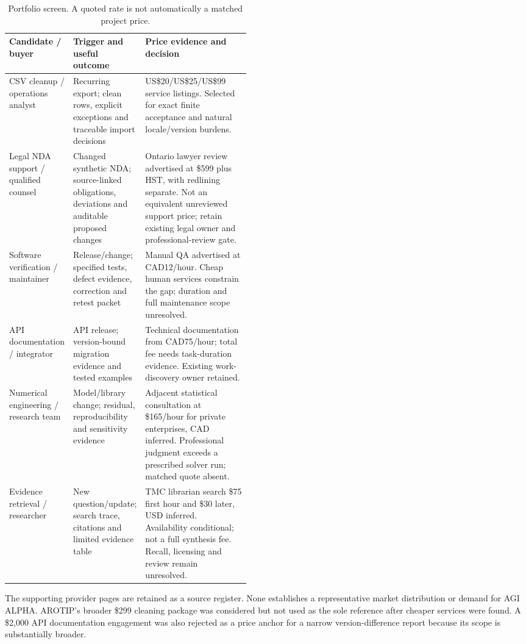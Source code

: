 \documentclass[11pt,letterpaper]{article}
\newcommand{\usd}[1]{US\$#1}
\begin{document}
\begin{table}[htbp]\small
\caption{Portfolio screen. A quoted rate is not automatically a matched project price.}
\begin{tabularx}{\linewidth}{@{}P{0.18\linewidth}P{0.28\linewidth}Y@{}}
\toprule
Candidate / buyer & Trigger and useful outcome & Price evidence and decision \\
\midrule
CSV cleanup / operations analyst & Recurring export; clean rows, explicit exceptions and traceable import decisions & \usd{20}/\usd{25}/\usd{99} service listings. Selected for exact finite acceptance and natural locale/version burdens. \\
Legal NDA support / qualified counsel & Changed synthetic NDA; source-linked obligations, deviations and auditable proposed changes & Ontario lawyer review advertised at \$599 plus HST, with redlining separate. Not an equivalent unreviewed support price; retain existing legal owner and professional-review gate. \\
Software verification / maintainer & Release/change; specified tests, defect evidence, correction and retest packet & Manual QA advertised at CAD12/hour. Cheap human services constrain the gap; duration and full maintenance scope unresolved. \\
API documentation / integrator & API release; version-bound migration evidence and tested examples & Technical documentation from CAD75/hour; total fee needs task-duration evidence. Existing work-discovery owner retained. \\
Numerical engineering / research team & Model/library change; residual, reproducibility and sensitivity evidence & Adjacent statistical consultation at \$165/hour for private enterprises, CAD inferred. Professional judgment exceeds a prescribed solver run; matched quote absent. \\
Evidence retrieval / researcher & New question/update; search trace, citations and limited evidence table & TMC librarian search \$75 first hour and \$30 later, USD inferred. Availability conditional; not a full synthesis fee. Recall, licensing and review remain unresolved. \\
\bottomrule
\end{tabularx}
\label{tab:portfolio}
\end{table}
The supporting provider pages are retained as a source register\cite{patrick,ricardo,khalil,flatly,qa,docsmart,sherbrooke,tmc}. None establishes a representative market distribution or demand for AGI ALPHA. AROTIP's broader \$299 cleaning package was considered but not used as the sole reference after cheaper services were found\cite{arotip}. A \$2,000 API documentation engagement was also rejected as a price anchor for a narrow version-difference report because its scope is substantially broader.
\end{document}
